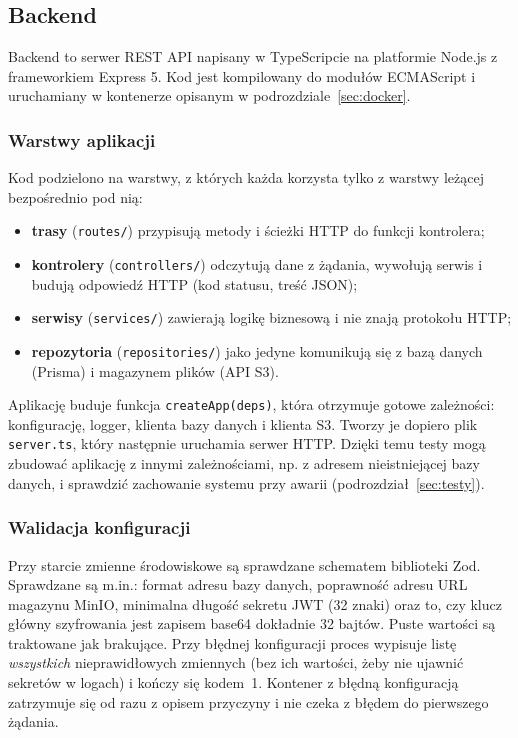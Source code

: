 \subsection{Backend}
\label{sec:backend}

Backend to serwer REST API napisany w TypeScripcie na platformie Node.js
z frameworkiem Express 5. Kod jest kompilowany do modułów
ECMAScript i uruchamiany w kontenerze opisanym w podrozdziale~\ref{sec:docker}.

\subsubsection{Warstwy aplikacji}

Kod podzielono na warstwy, z których każda korzysta tylko z warstwy leżącej
bezpośrednio pod nią:

\begin{itemize}
  \item \textbf{trasy} (\texttt{routes/}) przypisują metody i ścieżki HTTP
        do funkcji kontrolera;
  \item \textbf{kontrolery} (\texttt{controllers/}) odczytują dane z żądania,
        wywołują serwis i budują odpowiedź HTTP (kod statusu, treść JSON);
  \item \textbf{serwisy} (\texttt{services/}) zawierają logikę biznesową
        i nie znają protokołu HTTP;
  \item \textbf{repozytoria} (\texttt{repositories/}) jako jedyne komunikują się
        z bazą danych (Prisma) i magazynem plików (API S3).
\end{itemize}

Aplikację buduje funkcja \texttt{createApp(deps)}, która otrzymuje gotowe
zależności: konfigurację, logger, klienta bazy danych i klienta S3. Tworzy je
dopiero plik \texttt{server.ts}, który następnie uruchamia serwer HTTP. Dzięki
temu testy mogą zbudować aplikację z innymi zależnościami, np. z adresem
nieistniejącej bazy danych, i sprawdzić zachowanie systemu przy awarii
(podrozdział~\ref{sec:testy}).

\subsubsection{Walidacja konfiguracji}

Przy starcie zmienne środowiskowe są sprawdzane schematem biblioteki Zod.
Sprawdzane są m.in.: format adresu bazy danych, poprawność adresu
URL magazynu MinIO, minimalna długość sekretu JWT (32 znaki) oraz to, czy
klucz główny szyfrowania jest zapisem base64 dokładnie 32 bajtów. Puste
wartości są traktowane jak brakujące. Przy błędnej konfiguracji proces wypisuje
listę \emph{wszystkich} nieprawidłowych zmiennych (bez ich wartości, żeby nie
ujawnić sekretów w logach) i kończy się kodem~1. Kontener z błędną
konfiguracją zatrzymuje się od razu z opisem przyczyny i nie czeka z błędem
do pierwszego żądania.

